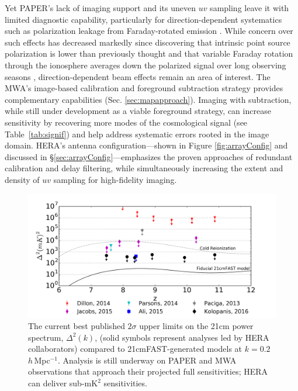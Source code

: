 \documentclass[preprint,11pt]{aastex}
\newcommand{\Mycitep}[1]{\citep{#1}}
\begin{document}
Yet PAPER's lack of imaging support and its uneven $uv$ sampling 
leave it with limited diagnostic capability, particularly for direction-dependent systematics
such as polarization leakage from Faraday-rotated emission \Mycitep{moore_et_al2013}.
While concern over such effects has decreased markedly since discovering that
intrinsic point source polarization is lower than previously thought
\citep{asad_et_al2015} and that variable Faraday rotation through the
ionosphere averages down the polarized signal over long observing seasons
\Mycitep{moore_et_al2016}, direction-dependent beam effects remain an area of interest.
The MWA's image-based calibration and foreground subtraction strategy provides complementary
capabilities (Sec. \ref{sec:mapapproach}). Imaging with subtraction, while still under development as a viable foreground strategy,
can increase sensitivity by recovering more modes of the cosmological signal (see
Table~\ref{tab:signif}) and help address systematic errors rooted
in the image domain.  HERA's antenna configuration---shown in Figure \ref{fig:arrayConfig} and discussed in \S\ref{sec:arrayConfig}---emphasizes
the proven approaches of redundant calibration and delay filtering, while simultaneously
increasing the extent and density of $uv$ sampling for high-fidelity imaging.  

\begin{figure}[t]
	\centering
	\includegraphics[width=.8\textwidth]{plots/summary_results.png}
	\caption{The current best published $2\sigma$ upper limits on the 21cm power spectrum, $\Delta^2(k)$, (solid symbols represent analyses led by HERA collaborators) compared to 21cmFAST-generated models at $k=0.2$\,$h$\,Mpc$^{-1}$.   Analysis is still underway on PAPER and MWA observations that approach their projected full sensitivities;  HERA can deliver sub-$\text{mK}^2$ sensitivities.}
	\vspace{-10pt}
	\label{fig:limits}
	\label{fig:IGMtemperatureConstraints}
\end{figure}
\end{document}
